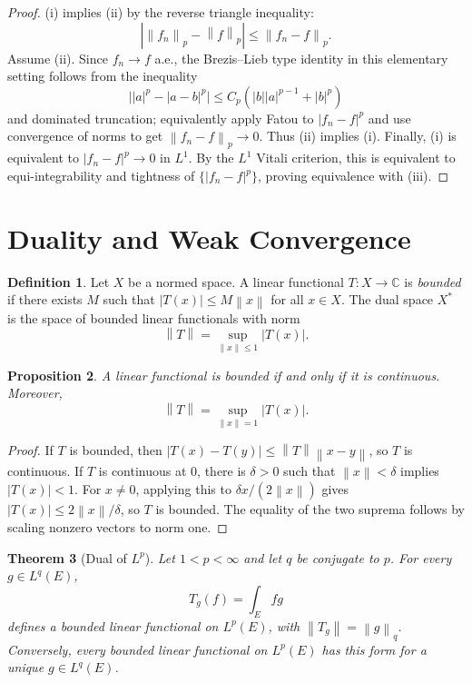 \documentclass[11pt,openany]{book}
\numberwithin{equation}{chapter}
\theoremstyle{definition}
\newtheorem{definition}{Definition}[chapter]
\theoremstyle{plain}
\newtheorem{theorem}[definition]{Theorem}
\newtheorem{proposition}[definition]{Proposition}
\theoremstyle{remark}
\newcommand{\C}{\mathbb{C}}
\newcommand{\1}{\mathbf{1}}
\newcommand{\abs}[1]{\left\lvert #1\right\rvert}
\newcommand{\norm}[1]{\left\lVert #1\right\rVert}
\begin{document}
\begin{proof}
(i) implies (ii) by the reverse triangle inequality:
\[
    \abs{\norm{f_n}_p-\norm f_p}\le\norm{f_n-f}_p.
\]
Assume (ii).  Since \(f_n\to f\) a.e., the Brezis--Lieb type identity in this elementary setting follows from the inequality
\[
    \bigl|\abs{a}^p-\abs{a-b}^p\bigr|\le C_p(\abs b\abs a^{p-1}+\abs b^p)
\]
and dominated truncation; equivalently apply Fatou to \(\abs{f_n-f}^p\) and use convergence of norms to get \(\norm{f_n-f}_p\to0\).  Thus (ii) implies (i).  Finally, (i) is equivalent to \(\abs{f_n-f}^p\to0\) in \(L^1\).  By the \(L^1\) Vitali criterion, this is equivalent to equi-integrability and tightness of \(\{\abs{f_n-f}^p\}\), proving equivalence with (iii).
\end{proof}

\section{Duality and Weak Convergence}

\begin{definition}
Let \(X\) be a normed space.  A linear functional \(T:X\to\C\) is \emph{bounded} if there exists \(M\) such that \(\abs{T(x)}\le M\norm x\) for all \(x\in X\).  The dual space \(X^*\) is the space of bounded linear functionals with norm
\[
    \norm T=\sup_{\norm x\le1}\abs{T(x)}.
\]
\end{definition}

\begin{proposition}
A linear functional is bounded if and only if it is continuous.  Moreover,
\[
    \norm T=\sup_{\norm x=1}\abs{T(x)}.
\]
\end{proposition}

\begin{proof}
If \(T\) is bounded, then \(\abs{T(x)-T(y)}\le\norm T\norm{x-y}\), so \(T\) is continuous.  If \(T\) is continuous at \(0\), there is \(\delta>0\) such that \(\norm x<\delta\) implies \(\abs{T(x)}<1\).  For \(x\ne0\), applying this to \(\delta x/(2\norm x)\) gives \(\abs{T(x)}\le 2\norm x/\delta\), so \(T\) is bounded.  The equality of the two suprema follows by scaling nonzero vectors to norm one.
\end{proof}

\begin{theorem}[Dual of \(L^p\)]
Let \(1<p<\infty\) and let \(q\) be conjugate to \(p\).  For every \(g\in L^q(E)\),
\[
    T_g(f)=\int_E f g
\]
defines a bounded linear functional on \(L^p(E)\), with \(\norm{T_g}=\norm g_q\).  Conversely, every bounded linear functional on \(L^p(E)\) has this form for a unique \(g\in L^q(E)\).
\end{theorem}
\end{document}
